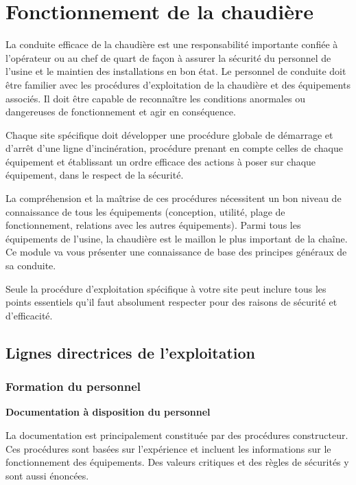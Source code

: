 \chapter{Fonctionnement de la chaudière}

La conduite efficace de la chaudière est une responsabilité importante confiée à l’opérateur ou au chef de quart de façon à assurer la sécurité du personnel de l’usine et le maintien des installations en bon état.
Le personnel de conduite doit être familier avec les procédures d’exploitation de la chaudière et des équipements associés. Il doit être capable de reconnaître les conditions anormales ou dangereuses de fonctionnement et agir en conséquence.
\vspace{0.3cm}

Chaque site spécifique doit développer une procédure globale de démarrage et d’arrêt d’une ligne d’incinération, procédure prenant en compte celles de chaque équipement et établissant un ordre  efficace des actions à poser sur chaque équipement, dans le respect de la sécurité.
\vspace{0.3cm}

La compréhension et la maîtrise de ces procédures nécessitent un bon niveau de connaissance de tous les équipements (conception, utilité, plage de fonctionnement, relations avec les autres équipements).
Parmi tous les équipements de l’usine, la chaudière est le maillon le plus important de la chaîne. Ce module va vous présenter une connaissance de base des principes généraux de sa conduite.
\vspace{0.3cm}

Seule la procédure d’exploitation spécifique à votre site peut inclure tous les points essentiels qu’il faut absolument respecter pour des raisons de sécurité et d’efficacité.



\section{Lignes directrices de l’exploitation}

\subsection{Formation du personnel}

\textbf{Documentation à disposition du personnel}

\vspace{0.3cm} 

La documentation est principalement constituée par des procédures constructeur. Ces procédures sont basées sur l’expérience et incluent les informations sur le fonctionnement des équipements. Des valeurs critiques et des règles de sécurités y sont aussi énoncées. 
\vspace{0.3cm}

